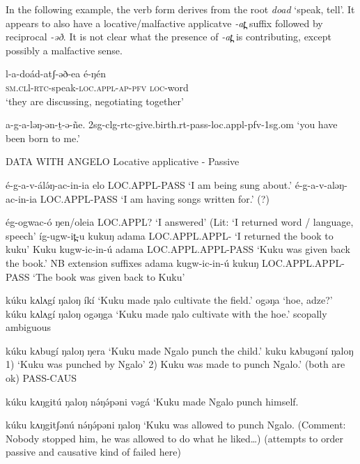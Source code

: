 In the following example, the verb form derives from the root \textit{doad} ‘speak, tell’. It appears to also have a locative/malfactive applicatve \textit{-at̪} suffix followed by reciprocal \textit{-əð}. It is not clear what the presence of \textit{-at̪} is contributing, except possibly a malfactive sense. %

\ea
\gll 	l-a-doád-atʃ-əð-ea 			é-ŋén\\
\textsc{sm.cl}l-\textsc{rtc}-speak-\textsc{loc.appl-ap-\textsc{pfv}} \textsc{	loc}-word\\
\trans ‘they are discussing, negotiating together’\\
\z



a-g-a-ləŋ-ən-ṯ-ə-ñe.
2sg-clg-rtc-give.birth.rt-pass-loc.appl-pfv-1sg.om
`you have been born to me.'


DATA WITH ANGELO
Locative applicative - Passive

é-g-a-v-álə́ŋ-ac-in-ia elo	LOC.APPL-PASS ‘I am being sung about.’
é-g-a-v-aləŋ-ac-in-ia		LOC.APPL-PASS ‘I am having songs written for.’ (?) 

ég-ogwac-ó ŋen/oleia	LOC.APPL?	‘I answered’ (Lit: ‘I returned word / language, speech’
íg-ugw-it̪-u kukuŋ adama	LOC.APPL.APPL- 	‘I returned the book to kuku’
Kuku kugw-ic-in-ú adama	LOC.APPL.APPL-PASS 	 ‘Kuku was given back the book.’
 NB extension suffixes
adama kugw-ic-in-ú kukuŋ LOC.APPL.APPL-PASS	‘The book was given back to Kuku’



kúku kʌlʌgí ŋaloŋ íkí			‘Kuku made ŋalo cultivate the field.’
ogəŋa					‘hoe, adze?’
kúku kʌlʌgí ŋaloŋ ogəŋga		‘Kuku made ŋalo cultivate with the hoe.’
 scopally ambiguous
 
kúku kʌbugí ŋaloŋ ŋera		‘Kuku made Ngalo punch the child.’
kuku kʌbugəní ŋaloŋ		1) ‘Kuku was punched by Ngalo’
					2) Kuku was made to punch Ngalo.’  (both are ok)
PASS-CAUS
 
kúku kʌŋgitú ŋaloŋ nə́ŋə́pəni vəgá	‘Kuku made Ngalo punch himself.

kúku kʌŋgitʃənú nə́ŋə́pəni ŋaloŋ	‘Kuku was allowed to punch Ngalo.
				(Comment: Nobody stopped him, he was allowed to do what he liked…)
(attempts to order passive and causative kind of failed here)
 
